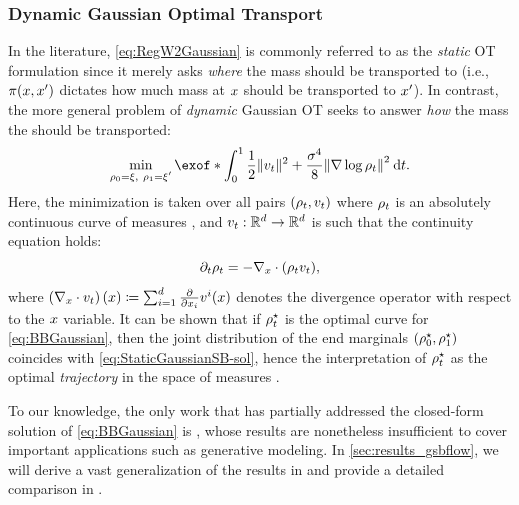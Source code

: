 \subsubsection{Dynamic Gaussian Optimal Transport}
\label{sec:dynamicGOT-BB}

In the literature, \eqref{eq:RegW2Gaussian} is commonly referred to as the \emph{static} \acrshort{OT} formulation since it merely asks \emph{where} the mass should be transported to (i.e., $\pi(x,x')$ dictates how much mass at $x$ should be transported to $x'$). In contrast, the more general problem of \emph{dynamic} Gaussian \acrshort{OT} seeks to answer \emph{how} the mass the should be transported:
\begin{align}
\label{eq:BBGaussian}
\min_{\ssstyle\substack{{\measure[0] = \xi,\ \measure[\horizon] = \xi'}}} \exof*{\int_{0}^\horizon  \frac{1}{2} \norm{\vect}^2 + \frac{\sigma^4}{8} \norm*{\nabla\log\measure}^2 \dt}.
\end{align}Here, the minimization is taken over all pairs $(\rho_{t}, v_t)$ where $\rho_{t}$ is an absolutely continuous curve of measures \citep{ambrosio2006gradient}, and $v_t:\mathbb{R}^d\to\mathbb{R}^d$ is such that the continuity equation holds:
\begin{equation}
\label{eq:Coneq}
\partial_{t}\rho_{t} = - \nabla_{ {x} } \cdot(\rho_{t} v_t),
\end{equation}
where $\left(\nabla_{ {x} } \cdot v_t\right)(x) \coloneqq \sum_{i=1}^d \frac{\partial}{\partial x_i}v^{i}(x)$ denotes the divergence operator with respect to the $x$ variable. It can be shown that if $\rho_{t}^\star$ is the optimal curve for \eqref{eq:BBGaussian}, then the joint distribution of the end marginals $(\rho^\star_0, \rho_1^\star)$ coincides with \eqref{eq:StaticGaussianSB-sol}, hence the interpretation of $\rho_{t}^\star$ as the optimal \emph{trajectory} in the space of measures  \citep{chen2016relation, gentil2017analogy, chen2021stochastic, gentil2020dynamical}.

To our knowledge, the only work that has partially addressed the closed-form solution of \eqref{eq:BBGaussian} is \citet{mallasto2021entropy}, whose results are nonetheless insufficient to cover important applications such as generative modeling. In \cref{sec:results_gsbflow}, we will derive a vast generalization of the results in \citet{mallasto2021entropy} and provide a detailed comparison in .


